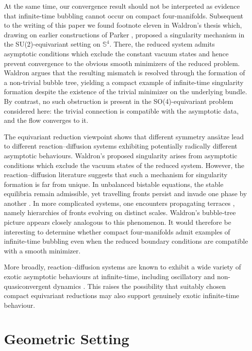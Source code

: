 \documentclass[11pt,a4paper]{article}
\numberwithin{equation}{section}
\theoremstyle{plain}
\theoremstyle{remark}
\begin{document}
At the same time, our convergence result should not be interpreted as evidence that infinite-time bubbling cannot occur on compact four-manifolds. Subsequent to the writing of this paper we found footnote eleven in Waldron's thesis \cite{Waldron2014Thesis} which, drawing on earlier constructions of Parker \cite{Parker1992NonMinimal}, proposed a singularity mechanism in the SU(2)-equivariant setting on $\mathbb S^4$. There, the reduced system admits asymptotic conditions which exclude the constant vacuum states and hence prevent convergence to the obvious smooth minimizers of the reduced problem. Waldron argues that the resulting mismatch is resolved through the formation of a non-trivial bubble tree, yielding a compact example of infinite-time singularity formation despite the existence of the trivial minimizer on the underlying bundle. By contrast, no such obstruction is present in the SO(4)-equivariant problem considered here: the trivial connection is compatible with the asymptotic data, and the flow converges to it.

The equivariant reduction viewpoint shows that different symmetry ans\"{a}tze lead to different reaction–diffusion systems exhibiting potentially radically different asymptotic behaviours. Waldron’s proposed singularity arises from asymptotic conditions which exclude the vacuum states of the reduced system. However, the reaction–diffusion literature suggests that such a mechanism for singularity formation is far from unique. In unbalanced bistable equations, the stable equilibria remain admissible, yet travelling fronts persist and invade one phase by another \cite{Fukao2004}. In more complicated systems, one encounters propagating terraces \cite{alma992983579365301631}, namely hierarchies of fronts evolving on distinct scales. Waldron’s bubble-tree picture appears closely analogous to this phenomenon. It would therefore be interesting to determine whether compact four-manifolds admit examples of infinite-time bubbling even when the reduced boundary conditions are compatible with a smooth minimizer.

More broadly, reaction–diffusion systems are known to exhibit a wide variety of exotic asymptotic behaviours at infinite-time, including oscillatory and non-quasiconvergent dynamics \cite{inbook}. This raises the possibility that suitably chosen compact equivariant reductions may also support genuinely exotic infinite-time behaviour.



\section{Geometric Setting}
\end{document}
